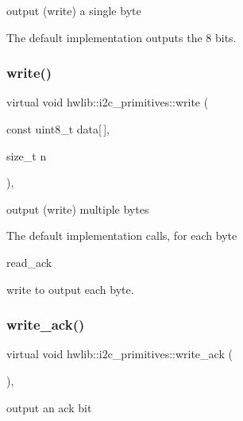 output (write) a single byte

The default implementation outputs the 8 bits. \mbox{\label{classhwlib_1_1i2c__primitives_ac1b43fe4971b5df06a0b45f2154e7864}} 
\subsubsection{\texorpdfstring{write()}{write()}\hspace{0.1cm}{\footnotesize\ttfamily [2/2]}}
{\footnotesize\ttfamily virtual void hwlib\+::i2c\+\_\+primitives\+::write (\begin{DoxyParamCaption}\item[{const uint8\+\_\+t}]{data\mbox{[}$\,$\mbox{]},  }\item[{size\+\_\+t}]{n }\end{DoxyParamCaption})\hspace{0.3cm}{\ttfamily [inline]}, {\ttfamily [virtual]}}

output (write) multiple bytes

The default implementation calls, for each byte
\begin{DoxyItemize}
\item read\+\_\+ack
\item write to output each byte. 
\end{DoxyItemize}\mbox{\label{classhwlib_1_1i2c__primitives_a711df86e5129b7daeff7a622b7b734c6}} 
\subsubsection{\texorpdfstring{write\+\_\+ack()}{write\_ack()}}
{\footnotesize\ttfamily virtual void hwlib\+::i2c\+\_\+primitives\+::write\+\_\+ack (\begin{DoxyParamCaption}{ }\end{DoxyParamCaption})\hspace{0.3cm}{\ttfamily [inline]}, {\ttfamily [virtual]}}

output an ack bit

